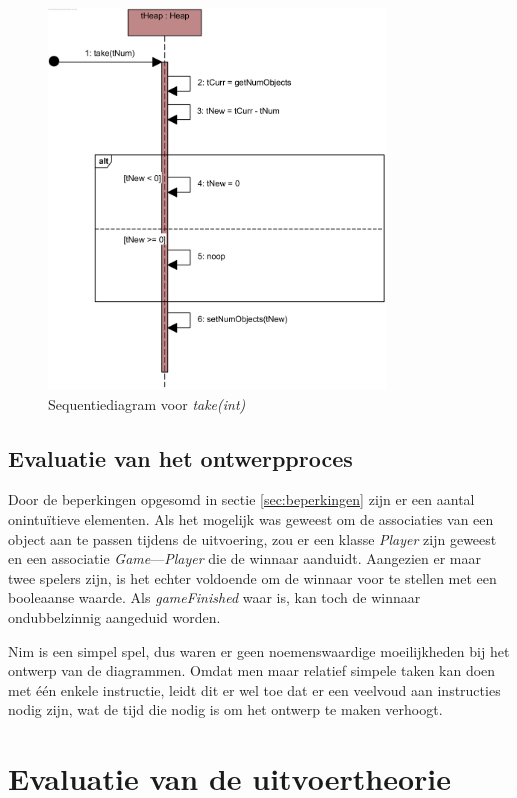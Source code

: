 \begin{figure}[h]
	\includegraphics[width=0.8\textwidth]{chap-evaluatie/take.png}
	\caption{Sequentiediagram voor \textit{take(int)}}
	\label{fig:nim-take}
\end{figure}

\subsection{Evaluatie van het ontwerpproces}

Door de beperkingen opgesomd in sectie \ref{sec:beperkingen} zijn er een aantal onintu\"itieve elementen. Als het mogelijk was geweest om de associaties van een object aan te passen tijdens de uitvoering, zou er een klasse \textit{Player} zijn geweest en een associatie \textit{Game}---\textit{Player} die de winnaar aanduidt. Aangezien er maar twee spelers zijn, is het echter voldoende om de winnaar voor te stellen met een booleaanse waarde. Als \textit{gameFinished} waar is, kan toch de winnaar ondubbelzinnig aangeduid worden.

Nim is een simpel spel, dus waren er geen noemenswaardige moeilijkheden bij het ontwerp van de diagrammen. Omdat men maar relatief simpele taken kan doen met \'e\'en enkele instructie, leidt dit er wel toe dat er een veelvoud aan instructies nodig zijn, wat de tijd die nodig is om het ontwerp te maken verhoogt.

\section{Evaluatie van de uitvoertheorie}

